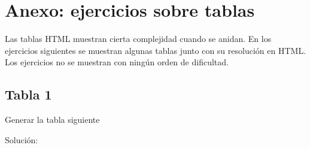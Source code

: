 \documentclass[letterpaper,10pt,spanish]{sphinxmanual}
\begin{document}
\chapter{Anexo: ejercicios sobre tablas}
\label{ejercicios/html/anexo_tablas:anexo-ejercicios-sobre-tablas}\label{ejercicios/html/anexo_tablas::doc}
Las tablas HTML muestran cierta complejidad cuando se anidan. En los ejercicios
siguientes se muestran algunas tablas junto con su resolución en HTML. Los
ejercicios no se muestran con ningún orden de dificultad.


\section{Tabla 1}
\label{ejercicios/html/anexo_tablas:tabla-1}
Generar la tabla siguiente


Solución:
\end{document}
